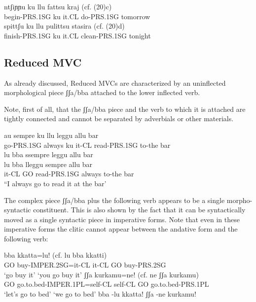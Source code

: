 \documentclass[output=paper,colorlinks,citecolor=brown,
]{langscibook}
\begin{document}
\ea
    \ea \gll ntʃiɲɲu     ku  llu   fattsu     kraj  (cf. (20)c) \\
     begin-PRS.1SG  ku  it.CL do-PRS.1SG  tomorrow\\
    \ex \gll spittʃu      ku  llu   pulittsu     stasira (cf. (20)d) \\
     finish-PRS.1SG ku it.CL clean-PRS.1SG  tonight\\
    \z
\z


\subsection{Reduced MVC}

As already discussed, Reduced MVCs are characterized by an uninflected morphological piece ʃʃa/bba attached to the lower inflected verb.   

Note, first of all, that the ʃʃa/bba piece and the verb to which it is attached are tightly connected and cannot be separated by adverbials or other materials. 

\ea
    \ea \gll au       sempre  ku  llu   leggu       allu  bar\\
    go-PRS.1SG   always   ku  it-CL  read-PRS.1SG to-the bar\\
    \ex  *lu bba ssempre leggu allu bar\\
    \ex \gll lu    bba lleggu       sempre  allu   bar \\
    it-CL   GO  read-PRS.1SG  always  to-the   bar \\
  \glt  “I always go to read it at the bar’
  \z
\z

The complex piece ʃʃa/bba plus the following verb appears to be a single morpho-syntactic constituent.  This is also shown by the fact that it can be syntactically moved as a single syntactic piece in imperative forms. Note that even in these imperative forms the clitic cannot appear between the andative form and the following verb:

\ea
    \ea \gll bba  kkatta=lu!      (cf. lu   bba  kkatti)\\
    GO buy-IMPER.2SG=it-CL   {} it-CL GO  buy-PRS.2SG \\
    \glt ‘go buy it’   \hspace{8em}         ‘you go buy it’
  \ex \gll ʃʃa  kurkamu=ne!    (cf. ne   ʃʃa   kurkamu)\\
    GO go.to.bed-IMPER.1PL=self-CL  { } self-CL GO  go.to.bed-PRS.1PL \\
    \glt ‘let’s go to bed’  \hspace{3.25cm}   ‘we go to bed’
  \ex  *bba -lu kkatta!  
  \ex *ʃʃa -ne kurkamu!  
\end{document}
